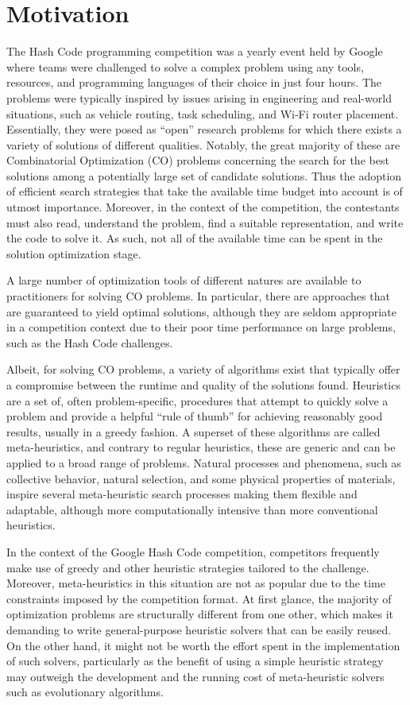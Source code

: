 \section{Motivation}
\label{section:motivation}

The Hash Code programming competition was a yearly event held by Google where
teams were challenged to solve a complex problem using any tools, resources, and
programming languages of their choice in just four hours. The problems were
typically inspired by issues arising in engineering and real-world situations,
such as vehicle routing, task scheduling, and Wi-Fi router placement.
Essentially, they were posed as ``open'' research problems for which there
exists a variety of solutions of different qualities. Notably, the great
majority of these are Combinatorial Optimization (CO) problems concerning the
search for the best solutions among a potentially large set of candidate
solutions. Thus the adoption of efficient search strategies that take the
available time budget into account is of utmost importance. Moreover, in the
context of the competition, the contestants must also read, understand the
problem, find a suitable representation, and write the code to solve it. As
such, not all of the available time can be spent in the solution optimization
stage.

A large number of optimization tools of different natures are available to
practitioners for solving CO problems. In particular, there are approaches that
are guaranteed to yield optimal solutions, although they are seldom appropriate
in a competition context due to their poor time performance on large problems,
such as the Hash Code challenges.

Albeit, for solving CO problems, a variety of algorithms exist that
typically offer a compromise between the runtime and quality of the solutions
found. Heuristics are a set of, often problem-specific, procedures that attempt
to quickly solve a problem and provide a helpful ``rule of thumb'' for
achieving reasonably good results, usually in a greedy fashion. A superset of
these algorithms are called meta-heuristics, and contrary to regular heuristics,
these are generic and can be applied to a broad range of problems. Natural
processes and phenomena, such as collective behavior, natural selection, and
some physical properties of materials, inspire several meta-heuristic search
processes making them flexible and adaptable, although more computationally
intensive than more conventional heuristics.

In the context of the Google Hash Code competition, competitors frequently make
use of greedy and other heuristic strategies tailored to the challenge. Moreover,
meta-heuristics in this situation are not as popular due to the time constraints
imposed by the competition format. At first glance, the majority of
optimization problems are structurally different from one other, which makes it
demanding to write general-purpose heuristic solvers that can be easily reused.
On the other hand, it might not be worth the effort spent in the implementation
of such solvers, particularly as the benefit of using a simple heuristic
strategy may outweigh the development and the running cost of meta-heuristic
solvers such as evolutionary algorithms.

